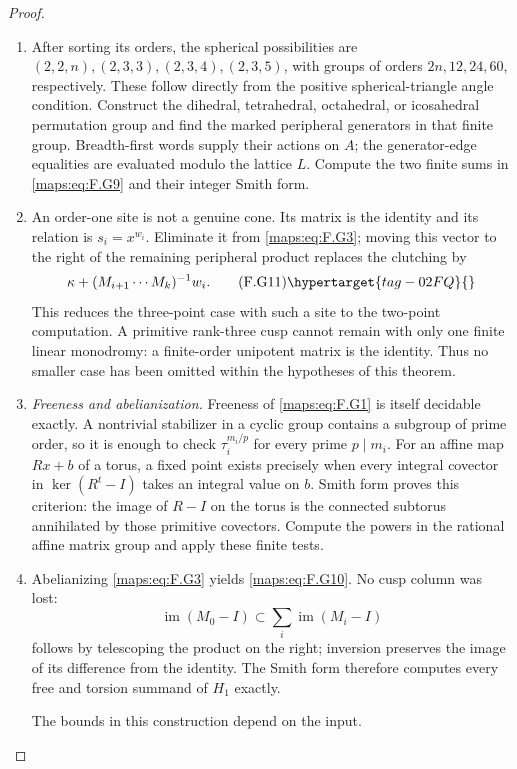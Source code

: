 \begin{proof}
\begin{enumerate}[label={$\langle1\rangle$\arabic*.}]
\item After sorting its orders, the spherical possibilities are
$(2,2,n),(2,3,3),(2,3,4),(2,3,5)$, with groups of orders
$2n,12,24,60$, respectively.  These follow directly from
the positive spherical-triangle angle condition.
Construct the dihedral, tetrahedral, octahedral, or icosahedral
permutation group and find the marked peripheral generators in that
finite group. Breadth-first words supply their actions on $A$;
the generator-edge equalities are evaluated modulo the lattice $L$.
Compute the two finite sums in \eqref{maps:eq:F.G9} and their integer Smith form.

\item An order-one site is not a genuine cone.  Its matrix is the
identity and its relation is $s_i=x^{w_i}$.  Eliminate it
from \eqref{maps:eq:F.G3}; moving this vector to the right of the remaining
peripheral product replaces the clutching by
\[
       \kappa+(M_{i+1}\cdots M_k)^{-1}w_i.                 \tag{F.G11}\hypertarget{tag-02FQ}{}\label{maps:eq:F.G11}
\]
This reduces the three-point case with such a site to the
two-point computation.  A primitive rank-three cusp cannot
remain with only one finite linear monodromy: a finite-order
unipotent matrix is the identity.  Thus no smaller case has
been omitted within the hypotheses of this theorem.

\item \emph{Freeness and abelianization.}
Freeness of \eqref{maps:eq:F.G1} is itself decidable exactly.  A nontrivial
stabilizer in a cyclic group contains a subgroup of prime
order, so it is enough to check $\tau_i^{m_i/p}$ for every
prime $p\mid m_i$.  For an affine map $Rx+b$ of a torus,
a fixed point exists precisely when every integral covector
in $\ker(R^t-I)$ takes an integral value on $b$.
Smith form proves this criterion: the image of $R-I$ on
the torus is the connected subtorus annihilated by those
primitive covectors. Compute the powers in the rational affine
matrix group and apply these finite tests.

\item Abelianizing \eqref{maps:eq:F.G3} yields \eqref{maps:eq:F.G10}.  No cusp column was lost:
\[
 \operatorname{im}(M_0-I)
       \subset\sum_i\operatorname{im}(M_i-I)
\]
follows by telescoping the product on the right; inversion
preserves the image of its difference from the identity.
The Smith form therefore computes every free and torsion
summand of $H_1$ exactly.

The bounds in this construction depend on the input.

\end{enumerate}
\end{proof}




